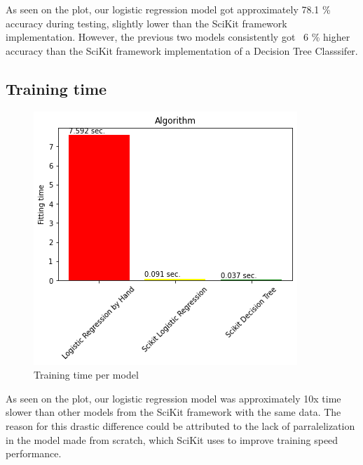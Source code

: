 \documentclass[letterpaper, 10 pt, conference]{ieeeconf}
\begin{document}
As seen on the plot, our logistic regression model got approximately 78.1 \% accuracy during testing, slightly lower than the SciKit framework
implementation. However, the previous two models consistently got ~6 \% higher accuracy than the SciKit framework implementation of a Decision Tree Classsifer. \\

\subsection{Training time}
\begin{figure}[thpb]
    \centering
    \includegraphics[scale=0.5]{figures/training_time.png}
    \caption{Training time per model}
    \label{training_time}
 \end{figure}

 As seen on the plot, our logistic regression model was approximately 10x time slower than other models from the SciKit framework with the same data.
 The reason for this drastic difference could be attributed to the lack of parralelization in the model made from scratch, which SciKit
 uses to improve training speed performance.
\end{document}
